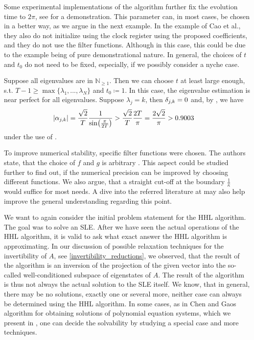 \phantom{}

Some experimental implementations of the algorithm further fix the evolution time to \(2\pi\), see \cite[p. 4-5]{Cao2011} for a demonstration. This parameter can, in most cases, be chosen in a better way, as we argue in the next example. In the example of Cao et al., they also do not initialize using the clock register using the proposed coefficients, and they do not use the filter functions. Although in this case, this could be due to the example being of pure demonstrational nature. In general, the choices of \(t\) and \(t_0\) do not need to be fixed, especially, if we possibly consider a nyche case.
\begin{example}
    Suppose all eigenvalues are in \(\mathbb{N}_{\geq 1}\). Then we can choose \(t\) at least large enough, s.t. \(T-1 \geq \max\{\lambda_1, ..., \lambda_N\}\) and \(t_0 \coloneqq 1\). In this case, the eigenvalue estimation is near perfect for all eigenvalues. Suppose \(\lambda_j = k\), then \(\delta_{j, k} = 0\) and, by , we have
    \begin{align}
        |\alpha_{j, k}| &= \frac{\sqrt{2}}{T} \frac{1}{\sin(\frac{\pi}{2T})} > \frac{\sqrt{2}}{T} \frac{2T}{\pi} = \frac{2\sqrt{2}}{\pi} > 0.9003
    \end{align}
    under the use of .
\end{example}

\phantom{}

To improve numerical stability, specific filter functions were chosen. The authors state, that the choice of \(f\) and \(g\) is arbitrary \cite[p. 6]{Harrow2008}. This aspect could be studied further to find out, if the numerical precision can be improved by choosing different functions. We also argue, that a straight cut-off at the boundary \(\frac{1}{\kappa}\) would suffice for most needs. A dive into the referred literature at \cite[p. 6]{Harrow2008} may also help improve the general understanding regarding this point.

\phantom{}

We want to again consider the initial problem statement for the HHL algorithm. The goal was to solve an SLE. After we have seen the actual operations of the HHL algorithm, it is valid to ask what exact answer the HHL algorithm is approximating. In our discussion of possible relaxation techniques for the invertibility of \(A\), see \ref{invertibility_reductions}, we observed, that the result of the algorithm is an inversion of the projection of the given vector into the so-called well-conditioned subspace of eigenstates of \(A\). The result of the algorithm is thus not always the actual solution to the SLE itself. We know, that in general, there may be no solutions, exactly one or several more, neither case can always be determined using the HHL algorithm. In some cases, as in Chen and Gaos algorithm for obtaining solutions of polynomial equation systems, which we present in , one can decide the solvability by studying a special case and more techniques.

